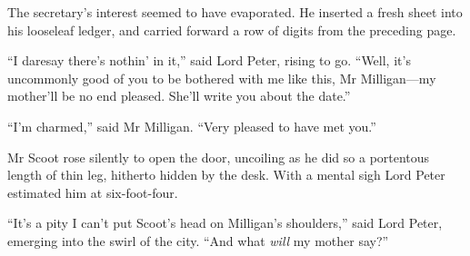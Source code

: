 The secretary’s interest seemed to have evaporated. He inserted a fresh sheet into his looseleaf ledger, and carried forward a row of digits from the preceding page.

\enquote{I daresay there’s nothin’ in it,} said Lord Peter, rising to go. \enquote{Well, it’s uncommonly good of you to be bothered with me like this, Mr Milligan\allowbreak---\allowbreak my mother’ll be no end pleased. She’ll write you about the date.}

\enquote{I’m charmed,} said Mr Milligan. \enquote{Very pleased to have met you.}

Mr Scoot rose silently to open the door, uncoiling as he did so a portentous length of thin leg, hitherto hidden by the desk. With a mental sigh Lord Peter estimated him at six-foot-four.

\enquote{It’s a pity I can’t put Scoot’s head on Milligan’s shoulders,} said Lord Peter, emerging into the swirl of the city. \enquote{And what \textit{will} my mother say?}